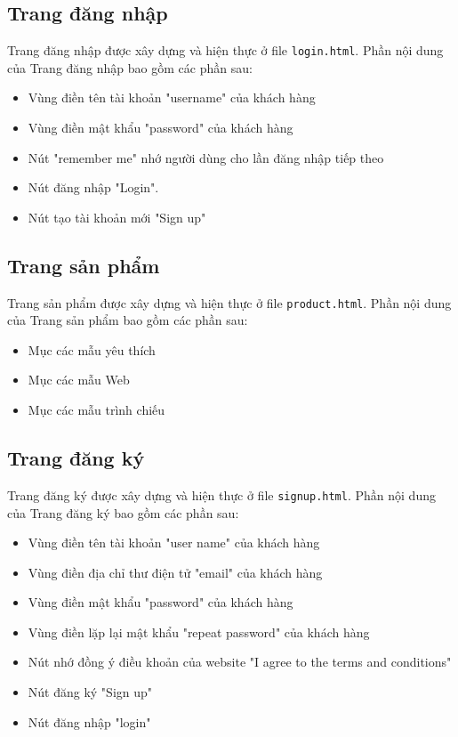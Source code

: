 \documentclass[a4paper]{article}
\begin{document}
\subsection{Trang đăng nhập}
Trang đăng nhập được xây dựng và hiện thực ở file \texttt{login.html}. Phần nội dung của Trang đăng nhập bao gồm các phần sau:
\begin{itemize}
    \item Vùng điền tên tài khoản "username" của khách hàng 
    \item Vùng điền mật khẩu "password" của khách hàng
    \item Nút "remember me" nhớ người dùng cho lần đăng nhập tiếp theo
    \item Nút đăng nhập "Login".
    \item Nút tạo tài khoản mới "Sign up"
\end{itemize}

\subsection{Trang sản phẩm}
Trang sản phẩm được xây dựng và hiện thực ở file \texttt{product.html}. Phần nội dung của Trang sản phẩm bao gồm các phần sau:
\begin{itemize}
    \item Mục các mẫu yêu thích
    \item Mục các mẫu Web
    \item Mục các mẫu trình chiếu 
\end{itemize}

\subsection{Trang đăng ký}
Trang đăng ký được xây dựng và hiện thực ở file \texttt{signup.html}. Phần nội dung của Trang đăng ký bao gồm các phần sau:
\begin{itemize}
    \item Vùng điền tên tài khoản "user name" của khách hàng 
    \item Vùng điền địa chỉ thư điện tử "email" của khách hàng 
    \item Vùng điền mật khẩu "password" của khách hàng
    \item Vùng điền lặp lại mật khẩu "repeat password" của khách hàng
    \item Nút nhớ đồng ý điều khoản của website "I agree to the terms and conditions"
    \item Nút đăng ký "Sign up"
    \item Nút đăng nhập "login"
\end{itemize}
\end{document}
